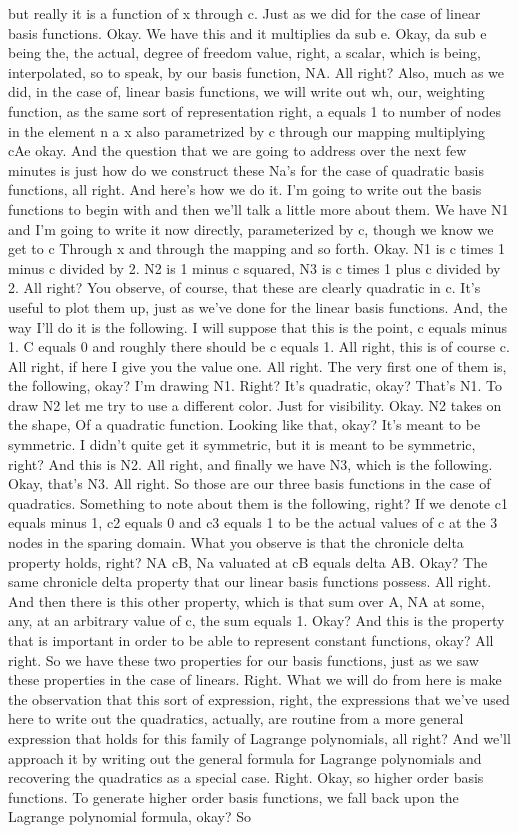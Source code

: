 \documentclass[10pt]{article}
\begin{document}
but really it is a function of x through c. Just as we did for the case of linear basis functions. Okay. We have this and it multiplies da sub e. Okay, da sub e being the, the actual, degree of freedom value, right, a scalar, which is being, interpolated, so to speak, by our basis function, NA. All right? Also, much as we did, in the case of, linear basis functions, we will write out wh, our, weighting function, as the same sort of representation right, a equals 1 to number of nodes in the element n a x also parametrized by c through our mapping multiplying cAe okay. And the question that we are going to address over the next few minutes is just how do we construct these Na's for the case of quadratic basis functions, all right. And here's how we do it. I'm going to write out the basis functions to begin with and then we'll talk a little more about them. We have N1 and I'm going to write it now directly, parameterized by c, though we know we get to c Through x and through the mapping and so forth. Okay. N1 is c times 1 minus c divided by 2. N2 is 1 minus c squared, N3 is c times 1 plus c divided by 2. All right? You observe, of course, that these are clearly quadratic in c. It's useful to plot them up, just as we've done for the linear basis functions. And, the way I'll do it is the following. I will suppose that this is the point, c equals minus 1. C equals 0 and roughly there should be c equals 1. All right, this is of course c. All right, if here I give you the value one. All right. The very first one of them is, the following, okay? I'm drawing N1. Right? It's quadratic, okay? That's N1. To draw N2 let me try to use a different color. Just for visibility. Okay. N2 takes on the shape, Of a quadratic function. Looking like that, okay? It's meant to be symmetric. I didn't quite get it symmetric, but it is meant to be symmetric, right? And this is N2. All right, and finally we have N3, which is the following. Okay, that's N3. All right. So those are our three basis functions in the case of quadratics. Something to note about them is the following, right? If we denote c1 equals minus 1, c2 equals 0 and c3 equals 1 to be the actual values of c at the 3 nodes in the sparing domain. What you observe is that the chronicle delta property holds, right? NA cB, Na valuated at cB equals delta AB. Okay? The same chronicle delta property that our linear basis functions possess. All right. And then there is this other property, which is that sum over A, NA at some, any, at an arbitrary value of c, the sum equals 1. Okay? And this is the property that is important in order to be able to represent constant functions, okay? All right. So we have these two properties for our basis functions, just as we saw these properties in the case of linears. Right. What we will do from here is make the observation that this sort of expression, right, the expressions that we've used here to write out the quadratics, actually, are routine from a more general expression that holds for this family of Lagrange polynomials, all right? And we'll approach it by writing out the general formula for Lagrange polynomials and recovering the quadratics as a special case. Right. Okay, so higher order basis functions. To generate higher order basis functions, we fall back upon the Lagrange polynomial formula, okay? So 
\end{document}
